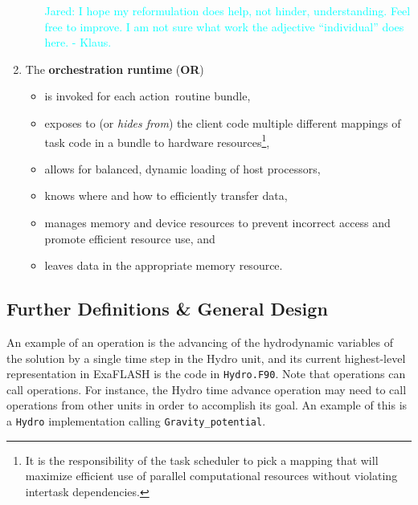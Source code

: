 \documentclass{article}
\newcommand{\code}[1]{{\tt#1}}
\newcommand{\FlashOfTheFuture}{ExaFLASH\xspace}
\newcommand{\JaredRfromKW}[1]   {\textcolor{cyan}{Jared: #1 - Klaus.}}
\newcommand{\shortOR}   {OR\xspace}
\newcommand{\qsaa}                   {action\ }                 %
\newcommand{\actionroutinebundle}  {\qsaa routine bundle\xspace}  %
\begin{document}
\begin{enumerate}
\begin{itemize}
\begin{itemize}
      \end{itemize}
      \JaredRfromKW{I hope my reformulation does help, not hinder, understanding.
        Feel free to improve.
        I am not sure what work the adjective ``individual'' does here.}
    \end{itemize}
\item{The \textbf{orchestration runtime} (\textbf{\shortOR})}
    \begin{itemize}
    \item{is invoked for each \actionroutinebundle,}
    \item{exposes to (or \emph{hides from}) the client code multiple different mappings of task code in a
    bundle to hardware resources\footnote{It is the responsibility of the task
    scheduler to pick a mapping that will maximize efficient use of parallel
    computational resources without violating intertask dependencies.},}
    \item{allows for balanced, dynamic loading of host processors,}
    \item{knows where and how to efficiently transfer data,}
    \item{manages memory and device resources to prevent incorrect access and
    promote efficient resource use, and}
    \item{leaves data in the appropriate memory resource.}
    \end{itemize}
\end{enumerate}

\subsection{Further Definitions \& General Design}
\label{sec:Definitions}
An example of an operation is the advancing of the hydrodynamic variables of the solution by a single time step
in the Hydro unit, and its current highest-level representation in \FlashOfTheFuture is the
code in \texttt{Hydro.F90}.  Note that operations can call operations.  For
instance, the Hydro time advance operation may need to call operations from other units
in order to accomplish its goal.  An example of this is a \code{Hydro}
implementation calling \code{Gravity\_potential}.\\
\end{document}
